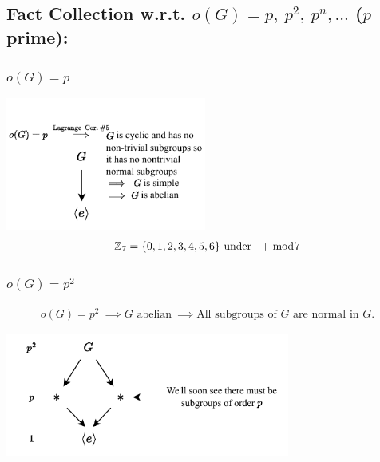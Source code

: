 \subsection*{Fact Collection w.r.t. $o(G)=p, \ p^2, \ p^n, ...$ ($p$ prime): }
\subsubsection*{$o(G)=p$}
\begin{center}
    \includegraphics[width=0.495\textwidth]{Figures/prime_order_lattice.pdf}
    \begin{align}
        {\mathbb{ Z}}_7 = \{0,1,2,3,4,5,6\} \text{ under } \ +\bmod 7\nonumber
    \end{align}
\end{center}
\subsubsection*{$o(G)=p^2$}
\begin{align}
        o(G)=p^2 \ \implies G \text{ abelian} \ \implies \text{All subgroups of }G \text{ are normal in }G. \nonumber 
\end{align}
\begin{center}
    \includegraphics[width=0.7\textwidth]{Figures/prime_squared_order_lattice.pdf}
\end{center}
